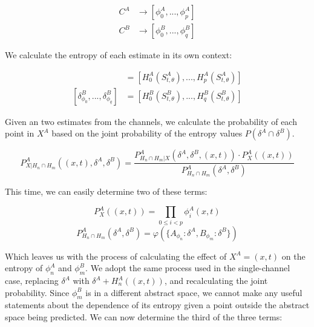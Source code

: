 \documentclass[10pt]{article}
\begin{document}
\begin{align*}
C^A &\rightarrow [\phi_0^A,...,\phi_p^A] \\
C^B &\rightarrow [\phi_0^B,...,\phi_q^B]
\end{align*}

We calculate the entropy of each estimate in its own context:

\begin{align*}
[\delta_{\phi_0}^A,...,\delta_{\phi_p}^A ] &= [ H_0^A( S_{t,\theta}^A ),...,H_p^A( S_{t,\theta}^A ) ] \\
[\delta_{\phi_0}^B,...,\delta_{\phi_q}^B ] &= [ H_0^B( S_{t,\theta}^B ),...,H_q^B( S_{t,\theta}^B ) ]
\end{align*}

Given an two estimates from the channels, we calculate the probability of each point in \(X^A \) based on the joint probability of the entropy values \(P(\delta^A \cap \delta^B) \).

\begin{equation}
P_{X|H_n \cap H_m}^A \left( (x,t), \delta^A, \delta^B \right) =
\frac 
{ P_{H_n \cap H_m | X}^A \left( \delta^A, \delta^B,(x,t) \right) \cdot P_X^A \left( (x,t) \right) }
{ P_{H_n \cap H_m}^A \left( \delta^A, \delta^B \right) }
\end{equation}

This time, we can easily determine two of these terms:

\begin{equation} P_X^A \left( (x,t) \right) = \prod_{0 \le i < p} \phi_i^A(x,t) \end{equation}
\begin{equation} P_{H_n \cap H_m}^A \left( \delta^A, \delta^B \right) = \varphi \left( \{ A_{\phi_n}: \delta^A, B_{\phi_m}: \delta^B \} \right) \end{equation}

Which leaves us with the process of calculating the effect of \(X^A = (x,t) \) on the entropy of \(\phi_n^A \) and \(\phi_m^B \).  We adopt the same process used in the single-channel case, replacing \(\delta^A \) with \(\delta^A + H_n^A((x,t)) \), and recalculating the joint probability. Since \(\phi_m^B \) is in a different abstract space, we cannot make any useful statements about the dependence of its entropy given a point outside the abstract space being predicted.  We can now determine the third of the three terms:
\end{document}
